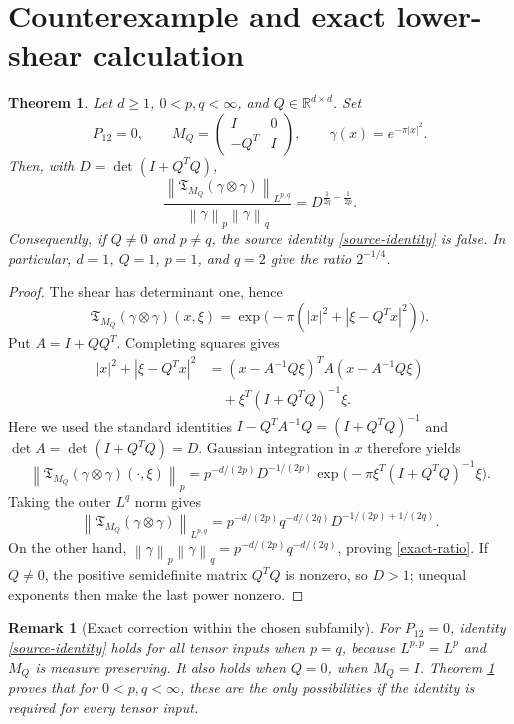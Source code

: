 \documentclass[11pt]{article}
\newtheorem{theorem}{Theorem}
\newtheorem{remark}{Remark}
\newcommand{\R}{\mathbb R}
\newcommand{\T}{\mathfrak T}
\newcommand{\norm}[1]{\left\lVert #1\right\rVert}
\begin{document}
\section{Counterexample and exact lower-shear calculation}

\begin{theorem}\label{thm:counterexample}
Let $d\ge1$, $0<p,q<\infty$, and $Q\in\R^{d\times d}$.  Set
\[
 P_{12}=0,
 \qquad
 M_Q=\begin{pmatrix}I&0\\-Q^T&I\end{pmatrix},
 \qquad
 \gamma(x)=e^{-\pi|x|^2}.
\]
Then, with $D=\det(I+Q^TQ)$,
\begin{equation}\label{exact-ratio}
 \frac{\norm{\T_{M_Q}(\gamma\otimes\gamma)}_{L^{p,q}}}
 {\norm\gamma_p\norm\gamma_q}
 =D^{\frac1{2q}-\frac1{2p}}.
\end{equation}
Consequently, if $Q\ne0$ and $p\ne q$, the source identity
\eqref{source-identity} is false.  In particular, $d=1$, $Q=1$, $p=1$,
and $q=2$ give the ratio $2^{-1/4}$.
\end{theorem}

\begin{proof}
The shear has determinant one, hence
\[
 \T_{M_Q}(\gamma\otimes\gamma)(x,\xi)
 =\exp\bigl(-\pi(|x|^2+|\xi-Q^Tx|^2)\bigr).
\]
Put $A=I+QQ^T$.  Completing squares gives
\begin{align*}
 |x|^2+|\xi-Q^Tx|^2
 &=(x-A^{-1}Q\xi)^TA(x-A^{-1}Q\xi)\\
 &\quad+\xi^T(I+Q^TQ)^{-1}\xi.
\end{align*}
Here we used the standard identities
$I-Q^TA^{-1}Q=(I+Q^TQ)^{-1}$ and
$\det A=\det(I+Q^TQ)=D$.  Gaussian integration in $x$ therefore yields
\[
 \norm{\T_{M_Q}(\gamma\otimes\gamma)(\cdot,\xi)}_p
 =p^{-d/(2p)}D^{-1/(2p)}
 \exp\bigl(-\pi\xi^T(I+Q^TQ)^{-1}\xi\bigr).
\]
Taking the outer $L^q$ norm gives
\[
 \norm{\T_{M_Q}(\gamma\otimes\gamma)}_{L^{p,q}}
 =p^{-d/(2p)}q^{-d/(2q)}D^{-1/(2p)+1/(2q)}.
\]
On the other hand,
$\norm\gamma_p\norm\gamma_q=p^{-d/(2p)}q^{-d/(2q)}$, proving
\eqref{exact-ratio}.  If $Q\ne0$, the positive semidefinite matrix $Q^TQ$
is nonzero, so $D>1$; unequal exponents then make the last power nonzero.
\end{proof}

\begin{remark}[Exact correction within the chosen subfamily]
For $P_{12}=0$, identity \eqref{source-identity} holds for all tensor inputs
when $p=q$, because $L^{p,p}=L^p$ and $M_Q$ is measure preserving.  It also
holds when $Q=0$, when $M_Q=I$.  Theorem \ref{thm:counterexample} proves that
for $0<p,q<\infty$, these are the only possibilities if the identity is
required for every tensor input.
\end{remark}
\end{document}
